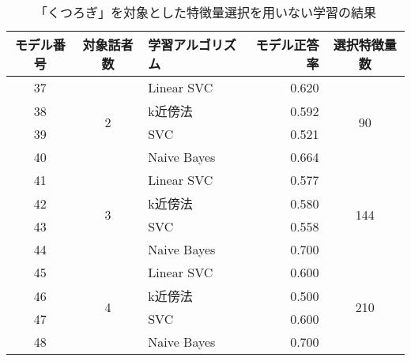 \begin{table}[tpb]
    \caption{「くつろぎ」を対象とした特徴量選択を用いない学習の結果}
    \centering
    \begin{tabular}{|c|c|l|r|c|}
        \hline
        モデル番号 & 対象話者数 & 学習アルゴリズム & モデル正答率 & 選択特徴量数 \\\hline\hline
        37 & \multirow{4}{*}{2} & Linear SVC & 0.620 & \multirow{4}{*}{90} \\ \cline{1-1}\cline{3-4}
        38 & & k近傍法 & 0.592 & \\ \cline{1-1}\cline{3-4}
        39 & & SVC & 0.521 & \\ \cline{1-1}\cline{3-4}
        40 & & Naive Bayes & 0.664 & \\ \hline
        41 & \multirow{4}{*}{3} & Linear SVC & 0.577 & \multirow{4}{*}{144} \\ \cline{1-1}\cline{3-4}
        42 & & k近傍法 & 0.580 & \\ \cline{1-1}\cline{3-4}
        43 & & SVC & 0.558 & \\ \cline{1-1}\cline{3-4}
        44 & & Naive Bayes & 0.700 & \\ \hline
        45 & \multirow{4}{*}{4} & Linear SVC & 0.600 & \multirow{4}{*}{210} \\ \cline{1-1}\cline{3-4}
        46 & & k近傍法 & 0.500 & \\ \cline{1-1}\cline{3-4}
        47 & & SVC & 0.600 & \\ \cline{1-1}\cline{3-4}
        48 & & Naive Bayes & 0.700 & \\ \hline
    \end{tabular}
    \label{tab:comfortable_learning_result_without_FS}
\end{table}
